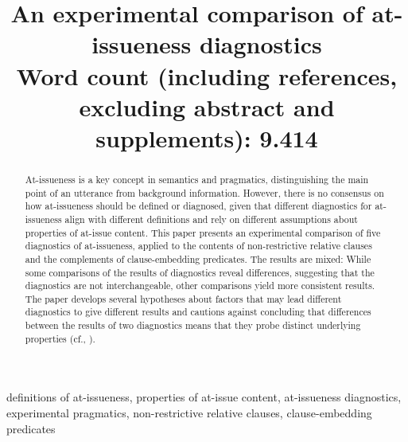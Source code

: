 \documentclass[times,linguex]{glossa}
\title[Comparing at-issueness diagnostics]{An experimental comparison of at-issueness diagnostics\\ 
\bigskip \large
Word count (including references, excluding abstract and supplements): 9.414
}
\author[]%
{%
}
\begin{document}
\maketitle
\begin{abstract}
  At-issueness is a key concept in semantics and pragmatics, distinguishing the main point of an utterance from background information. However, there is no consensus on how at-issueness should be defined or diagnosed, given that different diagnostics for at-issueness align with different definitions and rely on different assumptions about properties of at-issue content. This paper presents an experimental comparison of five diagnostics of at-issueness, applied to the contents of non-restrictive relative clauses and the complements of clause-embedding predicates. The results are mixed: While some comparisons of the results of diagnostics reveal differences, suggesting that the diagnostics are not interchangeable, other comparisons yield more consistent results. The paper develops several hypotheses about factors that may lead different diagnostics to give different results and cautions against concluding that differences between the results of two diagnostics means that they probe distinct underlying properties (cf., \citealt{snider_anaphoric_2017,koev_notions_2018}).
\end{abstract}

\begin{keywords} definitions of at-issueness, properties of at-issue content, at-issueness diagnostics, experimental pragmatics, non-restrictive relative clauses, clause-embedding predicates
\end{keywords}

\end{document}
